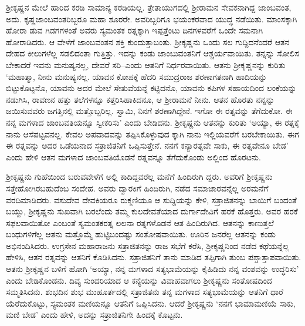 ಶ್ರೀಕೃಷ್ಣನ ಮೇಲೆ ಹಾರಿದ ಕರಡಿ ಸಾಮಾನ್ಯ ಕರಡಿಯಲ್ಲ. ತ್ರೇತಾಯುಗದಲ್ಲಿ ಶ್ರೀರಾಮನ ಸೇವಕನಾಗಿದ್ದ ಜಾಂಬವಂತ, ಅದು. ಕೃಷ್ಣಜಾಂಬವಂತರಿಬ್ಬರೂ ಮಹಾ ಶೂರರೇ. ಅವರಿಬ್ಬರಿಗೂ ಭಯಂಕರವಾದ ಯುದ್ಧ ನಡೆಯಿತು. ಮಾಂಸಕ್ಕಾಗಿ ಹೋರಾ ಡುವ ಗಿಡಗಗಳಂತೆ ಅವರು ಸ್ಯಮಂತಕ ರತ್ನಕ್ಕಾಗಿ ಇಪ್ಪತ್ತೆಂಟು ದಿನಗಳವರೆಗೆ ಒಂದೇ ಸಮನಾಗಿ ಹೋರಾಡಿದರು. ಆ ವೇಳೆಗೆ ಜಾಂಬವಂತನ ಶಕ್ತಿ ಕುಂದುತ್ತಾಬಂತು. ಶ್ರೀಕೃಷ್ಣನು ಒಂದು ಸಲ ಗುದ್ದಿದನೆಂದರೆ ಆತನ ದೇಹದ ಕೀಲುಗಳೆಲ್ಲ ಸಡಲಿದಂತಾ ಗುತ್ತಿತ್ತು. ಇದನ್ನು ಕಂಡು ಜಾಂಬುವಂತನಿಗೆ ಆಶ್ಚರ್ಯವಾಯಿತು. ತನ್ನನ್ನು ಸೋಲಿಸ ಬೇಕಾದರೆ ಇವನು ಮನುಷ್ಯನಲ್ಲ, ದೇವರೆ ಸರಿ–ಎಂದು ಆತನಿಗೆ ನಿರ್ಧರವಾಯಿತು. ಆತನು ಶ್ರೀಕೃಷ್ಣನನ್ನು ಕುರಿತು ‘ಮಹಾತ್ಮಾ, ನೀನು ಮನುಷ್ಯನಲ್ಲ. ಯಾವನ ಕೋಪಕ್ಕೆ ಹೆದರಿ ಸಮುದ್ರರಾಜ ಶರಣಾಗತನಾಗಿ ಹಾದಿಯನ್ನು ಬಿಟ್ಟುಕೊಟ್ಟನೊ, ಯಾವನು ಅದರ ಮೇಲೆ ಸೇತುವೆಯನ್ನೆ ಕಟ್ಟಿದನೊ, ಯಾವನು ಕಪಿಗಳ ಸಹಾಯದಿಂದ ಲಂಕೆಯನ್ನು ನಡುಗಿಸಿ, ರಾವಣನ ಹತ್ತು ತಲೆಗಳನ್ನೂ ಕತ್ತರಿಸಿಹಾಕಿದನೂ, ಆ ಶ್ರೀರಾಮನೆ ನೀನು. ಆತನ ಹೊರತು ನನ್ನನ್ನು ಜಯಿಸುವವರು ಜಗತ್ತಿನಲ್ಲಿ ಮತ್ತೊಬ್ಬರಿಲ್ಲ. ಸ್ವಾಮಿ, ನಿನಗೆ ಶರಣಾಗಿದ್ದೇನೆ. ಇಗೋ ಈ ರತ್ನವನ್ನು ತೆಗೆದುಕೋ. ಈ ನನ್ನ ಮಗಳಾದ ಜಾಂಬವತಿಯನ್ನೂ ಸ್ವೀಕರಿಸು’ ಎಂದು ಬೇಡಿದನು. ಶ್ರೀಕೃಷ್ಣನು ಆತನನ್ನು ಕುರಿತು ‘ಅಯ್ಯಾ, ಈ ರತ್ನಕ್ಕೆ ನಾನು ಆಸೆಪಟ್ಟವನಲ್ಲ. ಕೇವಲ ಅಪವಾದವನ್ನು ತಪ್ಪಿಸಿಕೊಳ್ಳುವುದ ಕ್ಕಾಗಿ ನಾನು ಇಲ್ಲಿಯವರೆಗೆ ಬರಬೇಕಾಯಿತು. ಈಗ ಈ ರತ್ನವನ್ನು ಅದರ ಒಡೆಯನಾದ ಸತ್ರಾಜಿತನಿಗೆ ಒಪ್ಪಿಸುತ್ತೇನೆ. ನನಗೆ ಕನ್ಯಾರತ್ನವೇ ಸಾಕು, ಈ ರತ್ನವೇನೂ ಬೇಡ’ ಎಂದು ಹೇಳಿ ಆತನ ಮಗಳಾದ ಜಾಂಬವತಿಯೊಡನೆ ರತ್ನವನ್ನೂ ತೆಗೆದುಕೊಂಡು ಅಲ್ಲಿಂದ ಹೊರಟನು.

ಶ್ರೀಕೃಷ್ಣನು ಗುಹೆಯಿಂದ ಬರುವವೇಳೆಗೆ ಅಲ್ಲಿ ಕಾದಿದ್ದವರೆಲ್ಲ ಮನೆಗೆ ಹಿಂದಿರುಗಿ ದ್ದರು. ಅವರಿಗೆ ಶ್ರೀಕೃಷ್ಣನು ಸತ್ತೇಹೋಗಿರಬಹುದೆಂಬ ಸಂದೇಹ. ಅವರು ದ್ವಾರಕಿಗೆ ಹಿಂದಿರುಗಿ, ನಡೆದ ಸಮಾಚಾರವನ್ನೆಲ್ಲ ಅರಮನೆಗೆ ವರದಿಮಾಡಿದರು. ವಸುದೇವ ದೇವಕಿಯರೂ ರುಕ್ಮಣಿಯೂ ಆ ಸುದ್ದಿಯನ್ನು ಕೇಳಿ, ಸತ್ರಾಜಿತನನ್ನು ಬಾಯಿಗೆ ಬಂದಂತೆ ಬಯ್ದು, ಶ್ರೀಕೃಷ್ಣನು ಸುಖವಾಗಿ ಬರಲೆಂದು ತಮ್ಮ ಕುಲದೇವತೆಯಾದ ದುರ್ಗಾದೇವಿಗೆ ಹರಕೆ ಹೊತ್ತರು. ಅವರ ಹರಕೆ ಸಫಲವಾಯಿತೋ ಎಂಬಂತೆ ಸ್ಯಮಂತಕರತ್ನ ಲಲನಾ ರತ್ನಗಳೊಡನೆ ಆತ ಹಿಂದಿರುಗಿದ. ಆತನನ್ನು ಕಾಣುತ್ತಲೆ ಬಂಧುಗಳಿಗೆಲ್ಲ ಆತನು ಮತ್ತೊಮ್ಮೆ ಹುಟ್ಟಿಬಂದಷ್ಟು ಸಂತೋಷವಾಯಿತು. ಊರಿನ ಜನರೆಲ್ಲ ಆತನನ್ನು ಕಂಡು ಅಭಿನಂದಿಸಿದರು. ಉಗ್ರಸೇನ ಮಹಾರಾಜನು ಸತ್ರಾಜಿತನನ್ನು ರಾಜ ಸಭೆಗೆ ಕರೆಸಿ, ಶ್ರೀಕೃಷ್ಣನಿಂದ ನಡೆದ ಕಥೆಯನ್ನೆಲ್ಲ ಹೇಳಿಸಿ, ಆತನ ರತ್ನವನ್ನು ಆತನಿಗೆ ಕೊಡಿಸಿದನು. ಸತ್ರಾಜಿತನಿಗೆ ತಾನು ಮಾಡಿದ ತಪ್ಪಿಗಾಗಿ ತುಂಬ ಪಶ್ಚಾತ್ತಾಪವಾಯಿತು. ಆತನು ಶ್ರೀಕೃಷ್ಣನ ಬಳಿಗೆ ಹೋಗಿ ‘ಅಯ್ಯಾ, ನನ್ನ ಮಗಳಾದ ಸತ್ಯಭಾಮೆಯನ್ನು ಕೈಹಿಡಿದು ನನ್ನ ವಂಶವನ್ನು ಉದ್ಧರಿಸು’ ಎಂದು ಬೇಡಿಕೊಂಡನು. ದಿವ್ಯ ಸುಂದರಿಯಾದ ಆ ಕನ್ಯೆಯನ್ನು ವಿವಾಹವಾಗಲು ಶ್ರೀಕೃಷ್ಣನು ಸಂತೋಷದಿಂದ ಸಮ್ಮತಿಸಿದನು. ಶುಭದಿನ ಶುಭ ಮುಹೂರ್ತದಲ್ಲಿ ಸತ್ರಾಜಿತನು ತನ್ನ ಮಗಳಾದ ಸತ್ಯಭಾಮೆಯನ್ನು ಆತನಿಗೆ ಧಾರೆ ಯೆರೆದುಕೊಟ್ಟು, ಸ್ಯಮಂತಕ ಮಣಿಯನ್ನೂ ಆತನಿಗೆ ಒಪ್ಪಿಸಿದನು. ಆದರೆ ಶ್ರೀಕೃಷ್ಣನು ‘ನನಗೆ ಭಾಮಾಮಣಿಯೆ ಸಾಕು, ಮಣಿ ಬೇಡ’ ಎಂದು ಹೇಳಿ, ಅದನ್ನು ಸತ್ರಾಜಿತನಿಗೇ ಹಿಂದಕ್ಕೆ ಕೊಟ್ಟನು.


